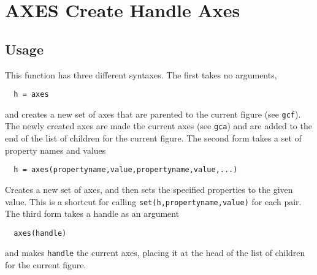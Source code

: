 \section{AXES Create Handle Axes}

\subsection{Usage}

This function has three different syntaxes.  The first takes
no arguments,
\begin{verbatim}
  h = axes
\end{verbatim}
and creates a new set of axes that are parented to the current
figure (see \verb|gcf|).  The newly created axes are made the current
axes (see \verb|gca|) and are added to the end of the list of children 
for the current figure.
The second form takes a set of property names and values
\begin{verbatim}
  h = axes(propertyname,value,propertyname,value,...)
\end{verbatim}
Creates a new set of axes, and then sets the specified properties
to the given value.  This is a shortcut for calling 
\verb|set(h,propertyname,value)| for each pair.
The third form takes a handle as an argument
\begin{verbatim}
  axes(handle)
\end{verbatim}
and makes \verb|handle| the current axes, placing it at the head of
the list of children for the current figure.
